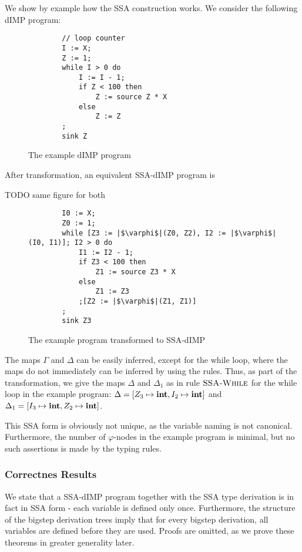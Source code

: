 We show by example how the SSA construction works.
We consider the following dIMP program:
\begin{figure}[h]
    \begin{verbatim}
        // loop counter
        I := X;
        Z := 1;
        while I > 0 do
            I := I - 1;
            if Z < 100 then
                Z := source Z * X
            else
                Z := Z
        ;
        sink Z
    \end{verbatim}    
    \caption{The example dIMP program}
    \label{fig:dimp-example}
\end{figure}
After transformation, an equivalent SSA-dIMP program is

TODO same figure for both


\begin{figure}[h]
    \begin{verbatim}
        I0 := X;
        Z0 := 1;
        while [Z3 := |$\varphi$|(Z0, Z2), I2 := |$\varphi$|(I0, I1)]; I2 > 0 do
            I1 := I2 - 1;
            if Z3 < 100 then
                Z1 := source Z3 * X
            else
                Z1 := Z3
            ;[Z2 := |$\varphi$|(Z1, Z1)]
        ;
        sink Z3
    \end{verbatim}    
    \caption{The example program transformed to SSA-dIMP}
    \label{fig:ssa-dimp-example}
\end{figure}
The maps $\Gamma$ and $\Delta$ can be easily inferred, except for the while loop,
where the maps do not immediately can be inferred by using the rules.
Thus, as part of the transformation, we give the maps $\Delta$ and 
$\Delta_1$ as in rule $\textsc{SSA-While}$ for the while loop in the example program:
$\Delta = [Z_3 \mapsto \textbf{int}, I_2 \mapsto \textbf{int}]$ and $\Delta_1 = [I_3 \mapsto \textbf{int}, Z_2 \mapsto \textbf{int}]$.

This SSA form is obviously not unique, as the variable naming is not canonical.
Furthermore, the number of $\varphi$-nodes in the example program is minimal,
but no such assertions is made by the typing rules.

\subsubsection*{Correctnes Results}
We state that a SSA-dIMP program together with the SSA type derivation
is in fact in SSA form - each variable is defined only once.
Furthermore, the structure of the bigstep derivation trees imply that 
for every bigstep derivation, all variables are defined before they are used.
Proofs are omitted, as we prove these theorems in greater generality later.


